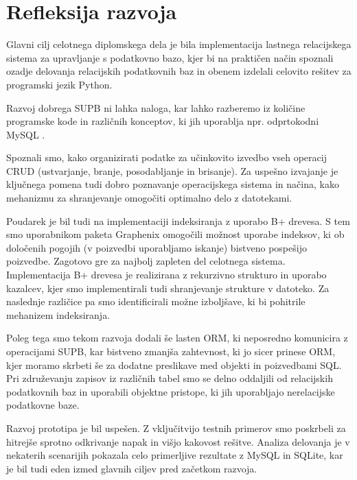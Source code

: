 \documentclass[a4paper,12pt,openright]{book}
\begin{document}
    \section{Refleksija razvoja}
    \label{refleksija}

    Glavni cilj celotnega diplomskega dela je bila implementacija lastnega relacijskega sistema za upravljanje s podatkovno bazo, kjer bi na praktičen način spoznali ozadje delovanja relacijskih podatkovnih baz in obenem izdelali celovito rešitev za programski jezik Python.

    Razvoj dobrega SUPB ni lahka naloga, kar lahko razberemo iz količine programske kode in različnih konceptov, ki jih uporablja npr. odprtokodni MySQL \cite{MYSQL_GITHUB}.
    
    Spoznali smo, kako organizirati podatke za učinkovito izvedbo vseh operacij CRUD (ustvarjanje, branje, posodabljanje in brisanje). Za uspešno izvajanje je ključnega pomena tudi dobro poznavanje operacijskega sistema in načina, kako mehanizmu za shranjevanje omogočiti optimalno delo z datotekami.
    
     Poudarek je bil tudi na implementaciji indeksiranja z uporabo B+ drevesa. S tem smo uporabnikom paketa Graphenix omogočili možnost uporabe indeksov, ki ob določenih pogojih (v poizvedbi uporabljamo iskanje) bistveno pospešijo poizvedbe. Zagotovo gre za najbolj zapleten del celotnega sistema. Implementacija B+ drevesa je realizirana z rekurzivno strukturo in uporabo kazalcev, kjer smo implementirali tudi shranjevanje strukture v datoteko. Za naslednje različice pa smo identificirali možne izboljšave, ki bi pohitrile mehanizem indeksiranja.
    
    Poleg tega smo tekom razvoja dodali še lasten ORM, ki neposredno komunicira z operacijami SUPB, kar bistveno zmanjša zahtevnost, ki jo sicer prinese ORM, kjer moramo skrbeti še za dodatne preslikave med objekti in poizvedbami SQL. Pri združevanju zapisov iz različnih tabel smo se delno oddaljili od relacijskih podatkovnih baz in uporabili objektne pristope, ki jih uporabljajo nerelacijske podatkovne baze.
    
    Razvoj prototipa je bil uspešen. Z vključitvijo testnih primerov smo poskrbeli za hitrejše sprotno odkrivanje napak in višjo kakovost rešitve. Analiza delovanja je v nekaterih scenarijih pokazala celo primerljive rezultate z MySQL in SQLite, kar je bil tudi eden izmed glavnih ciljev pred začetkom razvoja.


\raggedright

\printbibliography[heading=bibintoc,title={Literatura}]
\end{document}

